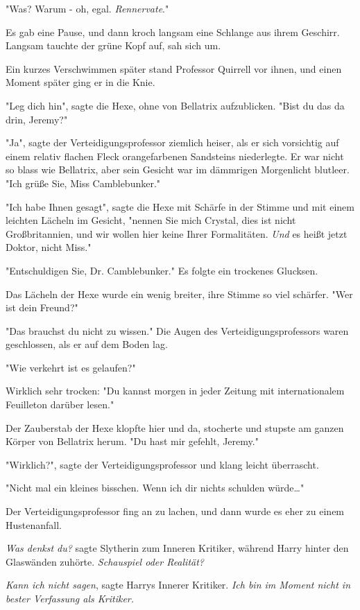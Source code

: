 {"Was? Warum - oh, egal. \emph{Rennervate}."

Es gab eine Pause, und dann kroch langsam eine Schlange aus ihrem Geschirr. Langsam tauchte der grüne Kopf auf, sah sich um.

Ein kurzes Verschwimmen später stand Professor Quirrell vor ihnen, und einen Moment später ging er in die Knie.

"Leg dich hin", sagte die Hexe, ohne von Bellatrix aufzublicken. "Bist du das da drin, Jeremy?"

"Ja", sagte der Verteidigungsprofessor ziemlich heiser, als er sich vorsichtig auf einem relativ flachen Fleck orangefarbenen Sandsteins niederlegte. Er war nicht so blass wie Bellatrix, aber sein Gesicht war im dämmrigen Morgenlicht blutleer. "Ich grüße Sie, Miss Camblebunker."

"Ich habe Ihnen gesagt", sagte die Hexe mit Schärfe in der Stimme und mit einem leichten Lächeln im Gesicht, "nennen Sie mich Crystal, dies ist nicht Großbritannien, und wir wollen hier keine Ihrer Formalitäten. \emph{Und} es heißt jetzt Doktor, nicht Miss."

"Entschuldigen Sie, Dr. Camblebunker." Es folgte ein trockenes Glucksen.

Das Lächeln der Hexe wurde ein wenig breiter, ihre Stimme so viel schärfer. "Wer ist dein Freund?"

"Das brauchst du nicht zu wissen." Die Augen des Verteidigungsprofessors waren geschlossen, als er auf dem Boden lag.

"Wie verkehrt ist es gelaufen?"

Wirklich sehr trocken: "Du kannst morgen in jeder Zeitung mit internationalem Feuilleton darüber lesen."

Der Zauberstab der Hexe klopfte hier und da, stocherte und stupste am ganzen Körper von Bellatrix herum. "Du hast mir gefehlt, Jeremy."

"Wirklich?", sagte der Verteidigungsprofessor und klang leicht überrascht.

"Nicht mal ein kleines bisschen. Wenn ich dir nichts schulden würde…"

Der Verteidigungsprofessor fing an zu lachen, und dann wurde es eher zu einem Hustenanfall.

\emph{Was denkst du?} sagte Slytherin zum Inneren Kritiker, während Harry hinter den Glaswänden zuhörte. \emph{Schauspiel oder Realität?}

\emph{Kann ich nicht sagen}, sagte Harrys Innerer Kritiker. \emph{Ich bin im Moment nicht in bester Verfassung als Kritiker.}

}
